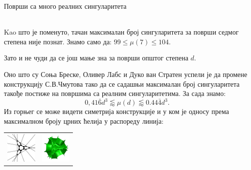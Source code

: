 \documentclass[sr]{./../../common/SurferDesc}%
\begin{document}
\footnotesize




\begin{surferPage}
  \begin{surferTitle}Површи са много реалних сингуларитета\end{surferTitle}   \\
    Kao што је поменуто, тачан максималан број сингуларитета за површи 
	седмог степена није познат.
    Знамо само да: $99\le \mu(7) \le 104$. 


    Зато и не чуди да се још мање зна за површи општог степена  $d$. 

    Оно што су Соња Бреске, Оливер Лабс и Дуко ван Стратен успели је да промене 
	конструкцију С.В.Чмутова тако да се садашњи максималан број сингуларитета такође 
	постиже на површима са реалним сингуларитетима. 
    За сада знамо:
    \[0,41\bar{6}d^3 \lessapprox \mu(d) \lessapprox 0.44\bar{4} d^3.\]
     Из горњег се може видети симетрија конструкције и у ком је односу према максималном 
	 броју црних ћелија у распореду линија:
    \begin{center}
      \begin{tabular}{c@{\qquad}c}
        \includegraphics[height=1.5cm]{./../../common/images/vielesing.pdf}
        &
        \includegraphics[height=1.5cm]{./../../common/images/p9surface_von_oben}
      \end{tabular}
    \end{center}

  \begin{surferText}
     \end{surferText}
\end{surferPage}
\end{document}
